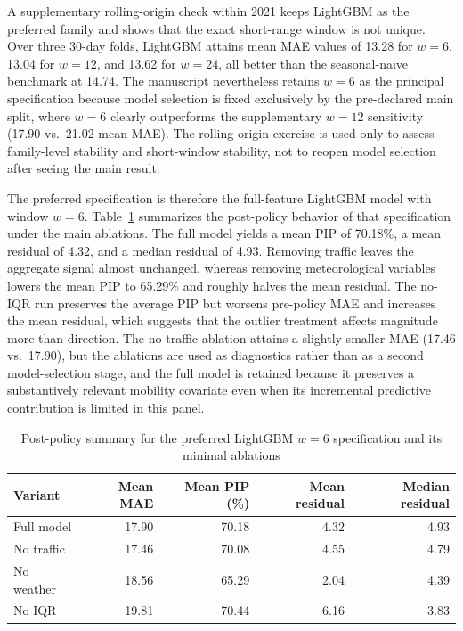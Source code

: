 A supplementary rolling-origin check within 2021 keeps LightGBM as the preferred family and shows that the exact short-range window is not unique. Over three 30-day folds, LightGBM attains mean MAE values of 13.28 for $w=6$, 13.04 for $w=12$, and 13.62 for $w=24$, all better than the seasonal-naive benchmark at 14.74. The manuscript nevertheless retains $w=6$ as the principal specification because model selection is fixed exclusively by the pre-declared main split, where $w=6$ clearly outperforms the supplementary $w=12$ sensitivity (17.90 vs.\ 21.02 mean MAE). The rolling-origin exercise is used only to assess family-level stability and short-window stability, not to reopen model selection after seeing the main result.

The preferred specification is therefore the full-feature LightGBM model with window $w=6$. Table~\ref{tab:ablation_summary} summarizes the post-policy behavior of that specification under the main ablations. The full model yields a mean PIP of 70.18\%, a mean residual of 4.32, and a median residual of 4.93. Removing traffic leaves the aggregate signal almost unchanged, whereas removing meteorological variables lowers the mean PIP to 65.29\% and roughly halves the mean residual. The no-IQR run preserves the average PIP but worsens pre-policy MAE and increases the mean residual, which suggests that the outlier treatment affects magnitude more than direction. The no-traffic ablation attains a slightly smaller MAE (17.46 vs.\ 17.90), but the ablations are used as diagnostics rather than as a second model-selection stage, and the full model is retained because it preserves a substantively relevant mobility covariate even when its incremental predictive contribution is limited in this panel.

\begin{table}[htbp]
\centering
\caption{Post-policy summary for the preferred LightGBM $w=6$ specification and its minimal ablations}
\label{tab:ablation_summary}
\begin{tabular}{@{}lrrrr@{}}
\toprule
Variant & Mean MAE & Mean PIP (\%) & Mean residual & Median residual \\
\midrule
Full model & 17.90 & 70.18 & 4.32 & 4.93 \\
No traffic & 17.46 & 70.08 & 4.55 & 4.79 \\
No weather & 18.56 & 65.29 & 2.04 & 4.39 \\
No IQR     & 19.81 & 70.44 & 6.16 & 3.83 \\
\bottomrule
\end{tabular}
\end{table}

